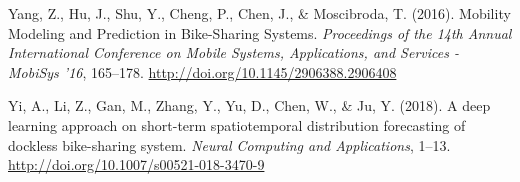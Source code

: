 \documentclass[12pt,oneside]{reedthesis}
\begin{document}
\hypertarget{ref-yang2016}{}
Yang, Z., Hu, J., Shu, Y., Cheng, P., Chen, J., \& Moscibroda, T.
(2016). Mobility Modeling and Prediction in Bike-Sharing Systems.
\emph{Proceedings of the 14th Annual International Conference on Mobile
Systems, Applications, and Services - MobiSys '16}, 165--178.
\url{http://doi.org/10.1145/2906388.2906408}

\hypertarget{ref-yi2018}{}
Yi, A., Li, Z., Gan, M., Zhang, Y., Yu, D., Chen, W., \& Ju, Y. (2018).
A deep learning approach on short-term spatiotemporal distribution
forecasting of dockless bike-sharing system. \emph{Neural Computing and
Applications}, 1--13. \url{http://doi.org/10.1007/s00521-018-3470-9}


\end{document}
